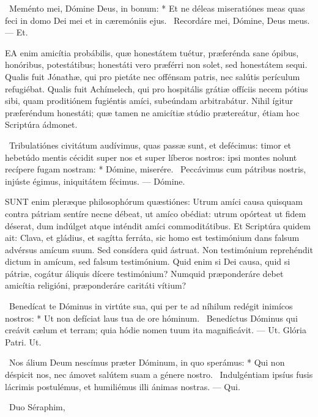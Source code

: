\R\ Meménto mei, Dómine Deus, in bonum: * Et ne déleas miseratiónes meas quas feci in domo Dei mei et in cæremóniis ejus. \V\ Recordáre mei, Dómine, Deus meus. — Et.


\lettrine[lines=2]{E}{A} enim amicítia probábilis, quæ honestátem tuétur, præferénda sane ópibus, honóribus, potestátibus; honestáti vero præférri non solet, sed honestátem sequi. Qualis fuit Jónathæ, qui pro pietáte nec offénsam patris, nec salútis perículum refugiébat. Qualis fuit Achímelech, qui pro hospitális grátiæ offíciis necem pótius sibi, quam proditiónem fugiéntis amíci, subeúndam arbitrabátur. Nihil ígitur præferéndum honestáti; quæ tamen ne amicítiæ stúdio prætereátur, étiam hoc Scriptúra ádmonet.

\R\ Tribulatiónes civitátum audívimus, quas passæ sunt, et defécimus: timor et hebetúdo mentis cécidit super nos et super líberos nostros: ipsi montes nolunt recípere fugam nostram: * Dómine, miserére. \V\ Peccávimus cum pátribus nostris, injúste égimus, iniquitátem fécimus. — Dómine.


\lettrine[lines=2]{S}{UNT} enim pleræque philosophórum quæstiónes: Utrum amíci causa quisquam contra pátriam sentíre necne débeat, ut amíco obédiat: utrum opórteat ut fidem déserat, dum indúlget atque inténdit amíci commoditátibus. Et Scriptúra quidem ait: Clava, et gládius, et sagítta ferráta, sic homo est testimónium dans falsum advérsus amícum suum. Sed consídera quid ástruat. Non testimónium reprehéndit dictum in amícum, sed falsum testimónium. Quid enim si Dei causa, quid si pátriæ, cogátur áliquis dícere testimónium? Numquid præponderáre debet amicítia religióni, præponderáre caritáti vítium?

\R\ Benedícat te Dóminus in virtúte sua, qui per te ad níhilum redégit inimícos nostros: * Ut non defíciat laus tua de ore hóminum. \V\ Benedíctus Dóminus qui creávit cælum et terram; quia hódie nomen tuum ita magnificávit. — Ut. Glória Patri. Ut.

\R\ Nos álium Deum nescímus præter Dóminum, in quo sperámus: * Qui non déspicit nos, nec ámovet salútem suam a génere nostro. \V\ Indulgéntiam ipsíus fusis lácrimis postulémus, et humiliémus illi ánimas nostras. — Qui.

\R\ Duo Séraphim, 


